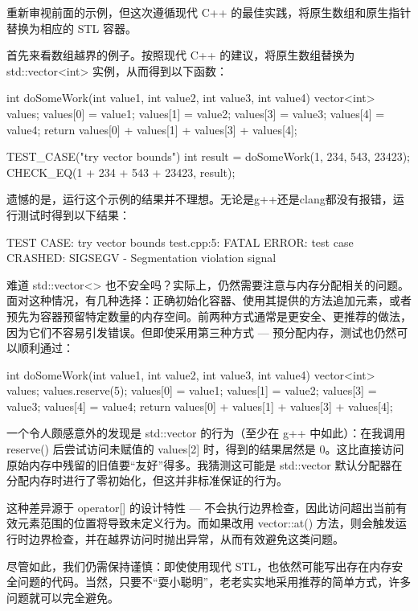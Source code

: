 重新审视前面的示例，但这次遵循现代 C++ 的最佳实践，将原生数组和原生指针替换为相应的 STL 容器。

首先来看数组越界的例子。按照现代 C++ 的建议，将原生数组替换为 std::vector<int> 实例，从而得到以下函数：

\begin{cpp}
int doSomeWork(int value1, int value2, int value3, int value4) {
  vector<int> values;
  values[0] = value1;
  values[1] = value2;
  values[3] = value3;
  values[4] = value4;
  return values[0] + values[1] + values[3] + values[4];
}

TEST_CASE("try vector bounds"){
  int result = doSomeWork(1, 234, 543, 23423);
  CHECK_EQ(1 + 234 + 543 + 23423, result);
}
\end{cpp}

遗憾的是，运行这个示例的结果并不理想。无论是g++还是clang都没有报错，运行测试时得到以下结果：

\begin{shell}
TEST CASE: try vector bounds
test.cpp:5: FATAL ERROR: test case CRASHED: SIGSEGV - Segmentation violation signal
\end{shell}

难道 std::vector<> 也不安全吗？实际上，仍然需要注意与内存分配相关的问题。面对这种情况，有几种选择：正确初始化容器、使用其提供的方法追加元素，或者预先为容器预留特定数量的内存空间。前两种方式通常是更安全、更推荐的做法，因为它们不容易引发错误。但即使采用第三种方式 --- 预分配内存，测试也仍然可以顺利通过：

\begin{cpp}
int doSomeWork(int value1, int value2, int value3, int value4) {
  vector<int> values;
  values.reserve(5);
  values[0] = value1;
  values[1] = value2;
  values[3] = value3;
  values[4] = value4;
  return values[0] + values[1] + values[3] + values[4];
}
\end{cpp}

一个令人颇感意外的发现是 std::vector 的行为（至少在 g++ 中如此）：在我调用 reserve() 后尝试访问未赋值的 values[2] 时，得到的结果居然是 0。这比直接访问原始内存中残留的旧值要“友好”得多。我猜测这可能是 std::vector 默认分配器在分配内存时进行了零初始化，但这并非标准保证的行为。

这种差异源于 operator[] 的设计特性 --- 不会执行边界检查，因此访问超出当前有效元素范围的位置将导致未定义行为。而如果改用 vector::at() 方法，则会触发运行时边界检查，并在越界访问时抛出异常，从而有效避免这类问题。

尽管如此，我们仍需保持谨慎：即使使用现代 STL，也依然可能写出存在内存安全问题的代码。当然，只要不“耍小聪明”，老老实实地采用推荐的简单方式，许多问题就可以完全避免。

